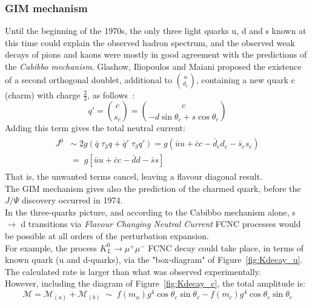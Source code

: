 \subsubsection{GIM mechanism}
\label{sec:gim}
Until the beginning of the 1970s, the only three light quarks u, d and s known at this time could explain the observed hadron spectrum, and the observed weak decays of pions
and kaons were mostly in good agreement with the predictions of the \textit{Cabibbo mechanism}.
Glashow, Iliopoulos and Maiani proposed the existence of a second orthogonal doublet, additional to $\binom{u}{d_c}$,  containing a new quark c (charm) with charge $\frac{2}{3}$, as follows~\cite{gim}:
\begin{equation} 
q' = \binom{c}{s_c} = \binom{c}{-d\sin\theta_{c}+s\cos\theta_c}
\end{equation}
Adding this term gives the total neutral current:
\begin {align}
\begin{split}
	J^{0} & \sim \; 2g (\bar{q} \; \tau_{3}q+ \bar{q}' \; \tau_{3}q')  = g(\bar{u} u + \bar{c}c - \bar{d}_{c} d_{c}- \bar{s}_{c} s_{c}) \\
	& = \; g[ \bar{u} u + \bar{c}c - \bar{d} d  - \bar{s}s ]
\end{split}						
\end{align}
That is, the unwanted terms cancel, leaving a flavour diagonal result.
\vspace{\baselineskip}
\\The GIM mechanism gives also the prediction of the charmed quark, before the $J/\Psi$ discovery occurred in 1974.\\
In the three-quarks picture, and according to the Cabibbo mechanism alone, s $\rightarrow$ d transitions via \textit{Flavour Changing Neutral Current} FCNC processes would be possible at all orders of the perturbation expansion. \\
For example, the process $K^{0}_{L}\rightarrow \mu^{+} \mu^{-}$ FCNC decay could take place, in terms of known quark (u and d-quarks), via the "box-diagram" of Figure~\ref{fig:Kdecay_u}.\\
The calculated rate is larger than what was observed experimentally. 
\vspace{\baselineskip}
\\However, including the diagram of Figure~\ref{fig:Kdecay_c}, the total amplitude is:
\begin{equation} 
\mathcal{M} = \mathcal{M}_{(a)} +\mathcal{M}_{(b)} \;\sim\;f(m_u)g^{4}\cos\theta_{c}\sin\theta_{c} - f(m_c)g^{4}\cos\theta_{c}\sin\theta_{c}
\end{equation}
